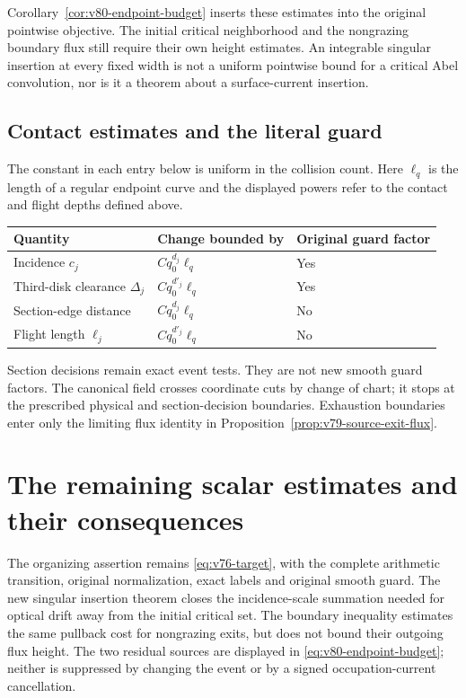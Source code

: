 \documentclass[11pt,reqno]{amsart}
\numberwithin{equation}{section}
\theoremstyle{definition}\newtheorem{definition}[theorem]{Definition}
\theoremstyle{remark}\newtheorem{remark}[theorem]{Remark}
\theoremstyle{definition}\newtheorem{inputstatement}[theorem]{Input statement}
\begin{document}
Corollary~\ref{cor:v80-endpoint-budget} inserts these estimates into
the original pointwise objective. The initial critical neighborhood
and the nongrazing boundary flux still require their own height
estimates. An integrable singular insertion at every fixed width is
not a uniform pointwise bound for a critical Abel convolution, nor
is it a theorem about a surface-current insertion.

\subsection{Contact estimates and the literal guard}
The constant in each entry below is uniform in the collision count.
Here $\ell_q$ is the length of a regular endpoint curve and the displayed
powers refer to the contact and flight depths defined above.
\begin{center}
\begin{tabular}{lll}
Quantity & Change bounded by & Original guard factor\\[2pt]
\hline
Incidence $c_j$ & $Cq_0^{d_j}\ell_q$ & Yes\\
Third-disk clearance $\Delta_j$ & $Cq_0^{d'_j}\ell_q$ & Yes\\
Section-edge distance & $Cq_0^{d_j}\ell_q$ & No\\
Flight length $\ell_j$ & $Cq_0^{d'_j}\ell_q$ & No
\end{tabular}
\end{center}
Section decisions remain exact event tests. They are not new smooth
guard factors. The canonical field crosses coordinate cuts by change
of chart; it stops at the prescribed physical and section-decision
boundaries. Exhaustion boundaries enter only the limiting flux identity
in Proposition~\ref{prop:v79-source-exit-flux}.











\section{The remaining scalar estimates and their consequences}
The organizing assertion remains \eqref{eq:v76-target}, with the
complete arithmetic transition, original normalization, exact labels
and original smooth guard. The new singular insertion theorem closes
the incidence-scale summation needed for optical drift away from the
initial critical set. The boundary inequality estimates the same
pullback cost for nongrazing exits, but does not bound their outgoing
flux height. The two residual sources are displayed in
\eqref{eq:v80-endpoint-budget}; neither is suppressed by changing the
event or by a signed occupation-current cancellation.
\end{document}
